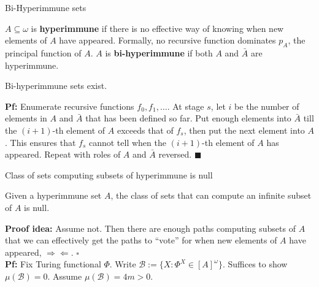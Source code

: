 \begin{frame}{Bi-Hyperimmune sets}
  \begin{define}
    $A\subseteq\omega$ is \textbf{hyperimmune} if there is no effective way
    of knowing when new elements of $A$ have appeared.  Formally, no
    recursive function dominates $p_A$, the principal function of $A$. $A$
    is \textbf{bi-hyperimmune} if both $A$ and $\bar{A}$ are hyperimmune.
  \end{define}

  \begin{thm}
    Bi-hyperimmune sets exist.
  \end{thm}

  \textbf{Pf:} Enumerate recursive functions $f_0,f_1,\ldots$. At stage
  $s$, let $i$ be the number of elements in $A$ and $\bar{A}$ that has been
  defined so far. Put enough elements into $\bar{A}$ till the $(i+1)$-th
  element of $A$ exceeds that of $f_s$, then put the next element into $A$.
  This ensures that $f_s$ cannot tell when the $(i+1)$-th element of $A$
  has appeared. Repeat with roles of $A$ and $\bar{A}$ reversed.
  $\blacksquare$
\end{frame}

\begin{frame}{Class of sets computing subsets of hyperimmune is null}
  \begin{thm}
    \label{thm:bihyper-null}
    Given a hyperimmune set $A$, the class of sets that can compute an
    infinite subset of $A$ is null.
  \end{thm}

  \vspace{1em}
  \textbf{Proof idea:} Assume not. Then there are enough paths computing
  subsets of $A$ that we can effectively get the paths to ``vote'' for when
  new elements of $A$ have appeared, $\Rightarrow\Leftarrow$. $\square$\\

  \vspace{1em}
  \textbf{Pf:} Fix Turing functional $\Phi$. Write $\mathcal{B} :=\{X:
  \Phi^X\in[A]^\omega\}$. Suffices to show $\mu(\mathcal{B})=0$. Assume
  $\mu(\mathcal{B})=4m>0$.
\end{frame}

